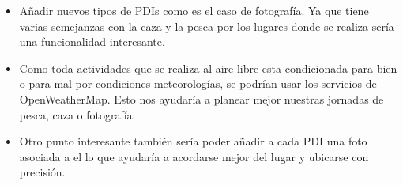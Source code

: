 \begin{itemize}
\item Añadir nuevos tipos de PDIs como es el caso de fotografía. Ya que tiene varias semejanzas con la caza y la pesca por los lugares donde se realiza sería una funcionalidad interesante.
\item Como toda actividades que se realiza al aire libre esta condicionada para bien o para mal por condiciones meteorologías, se podrían usar los servicios de OpenWeatherMap. Esto nos ayudaría a planear mejor nuestras jornadas de pesca, caza o fotografía.


\item Otro punto interesante también sería poder añadir a cada PDI una foto asociada a el lo que ayudaría a acordarse mejor del lugar y ubicarse con precisión.
\end{itemize}
